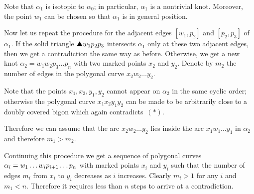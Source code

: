 Note that $\alpha_1$ is isotopic to $\alpha_0$;
in particular, $\alpha_1$ is a nontrivial knot.
Moreover, the point $w_1$ can be chosen so that $\alpha_1$ is in general position.

Now let us repeat the procedure for the adjacent edges $[w_1,p_2]$ and $[p_2,p_3]$ of $\alpha_1$.
If the solid triangle $\solidtriangle w_1p_2p_3$ intersects $\alpha_1$ only at these two adjacent edges, then we get a contradiction the same way as before.
Otherwise, we get a new knot $\alpha_2=w_1w_2p_3\dots p_n$ with two marked points $x_2$ and $y_2$.
Denote by $m_2$ the number of edges in the polygonal curve $x_2w_2\dots y_2$.

Note that the points $x_1,x_2,y_1,y_2$ cannot appear on $\alpha_2$ in the same cyclic order;
otherwise the polygonal curve $x_1x_2y_1y_2$ can be made to be arbitrarily close to a doubly covered bigon which again contradicts~$({*})$.

Therefore we can assume that the arc $x_2w_2\dots y_2$ lies inside the arc $x_1w_1\dots y_1$ in $\alpha_2$
and therefore $m_1>m_2$.

Continuing this procedure we get a sequence of polygonal curves $\alpha_i\z=w_1\dots w_i p_{i+1}\dots p_n$ with marked points $x_i$ and $y_i$ such that the number of edges $m_i$ from $x_i$ to $y_i$ decreases as $i$ increases.
Clearly $m_i>1$ for any $i$ and $m_1<n$.
Therefore it requires less than $n$ steps to arrive at a contradiction.
\qeds
